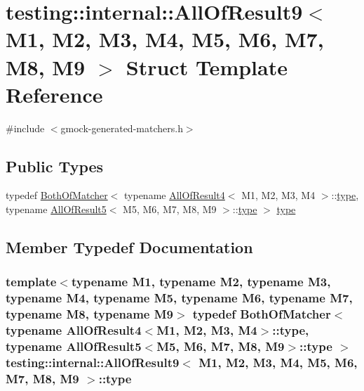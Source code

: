 \hypertarget{structtesting_1_1internal_1_1_all_of_result9}{}\section{testing\+:\+:internal\+:\+:All\+Of\+Result9$<$ M1, M2, M3, M4, M5, M6, M7, M8, M9 $>$ Struct Template Reference}
\label{structtesting_1_1internal_1_1_all_of_result9}


{\ttfamily \#include $<$gmock-\/generated-\/matchers.\+h$>$}

\subsection*{Public Types}
\begin{DoxyCompactItemize}
\item 
typedef \hyperlink{classtesting_1_1internal_1_1_both_of_matcher}{Both\+Of\+Matcher}$<$ typename \hyperlink{structtesting_1_1internal_1_1_all_of_result4}{All\+Of\+Result4}$<$ M1, M2, M3, M4 $>$\+::\hyperlink{structtesting_1_1internal_1_1_all_of_result9_ade56e18d2e0b745968b87fc394710edc}{type}, typename \hyperlink{structtesting_1_1internal_1_1_all_of_result5}{All\+Of\+Result5}$<$ M5, M6, M7, M8, M9 $>$\+::\hyperlink{structtesting_1_1internal_1_1_all_of_result9_ade56e18d2e0b745968b87fc394710edc}{type} $>$ \hyperlink{structtesting_1_1internal_1_1_all_of_result9_ade56e18d2e0b745968b87fc394710edc}{type}
\end{DoxyCompactItemize}


\subsection{Member Typedef Documentation}
\subsubsection[{\texorpdfstring{type}{type}}]{\setlength{\rightskip}{0pt plus 5cm}template$<$typename M1, typename M2, typename M3, typename M4, typename M5, typename M6, typename M7, typename M8, typename M9$>$ typedef {\bf Both\+Of\+Matcher}$<$ typename {\bf All\+Of\+Result4}$<$M1, M2, M3, M4$>$\+::{\bf type}, typename {\bf All\+Of\+Result5}$<$M5, M6, M7, M8, M9$>$\+::{\bf type} $>$ {\bf testing\+::internal\+::\+All\+Of\+Result9}$<$ M1, M2, M3, M4, M5, M6, M7, M8, M9 $>$\+::{\bf type}}\hypertarget{structtesting_1_1internal_1_1_all_of_result9_ade56e18d2e0b745968b87fc394710edc}{}\label{structtesting_1_1internal_1_1_all_of_result9_ade56e18d2e0b745968b87fc394710edc}


